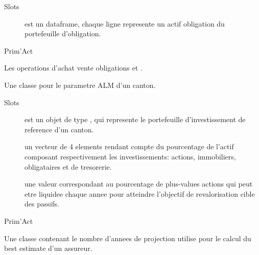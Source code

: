 \documentclass[a4paper]{book}
\begin{document}
%
\begin{Section}{Slots}

\begin{description}

\item[] est un dataframe, chaque ligne represente un actif obligation du portefeuille d'obligation.

\end{description}
\end{Section}
%
\begin{Author}\relax
Prim'Act
\end{Author}
%
\begin{SeeAlso}\relax
Les operations d'achat vente obligations   et .
\end{SeeAlso}
%
\begin{Description}\relax
Une classe pour le parametre ALM d'un canton.
\end{Description}
%
\begin{Section}{Slots}

\begin{description}

\item[] est un objet de type , qui represente le portefeuille
d'investissement de reference d'un canton.

\item[] un vecteur de 4 elements rendant compte du pourcentage
de l'actif composant respectivement les investissements: actions, immobiliers, obligataires et de tresorerie.

\item[] une valeur  correspondant au pourcentage de plus-values actions
qui peut etre liquidee chaque annee pour atteindre l'objectif de revalorisation cible des passifs.

\end{description}
\end{Section}
%
\begin{Author}\relax
Prim'Act
\end{Author}
%
\begin{Description}\relax
Une classe contenant le nombre d'annees de projection utilise
pour le calcul du best estimate d'un assureur.
\end{Description}
\end{document}
